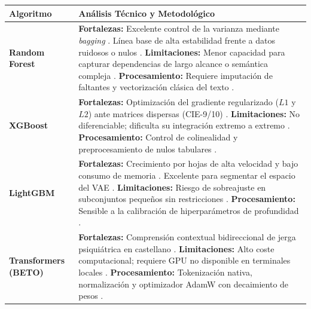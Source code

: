 \documentclass[12pt,a4paper,onecolumn,oneside]{report}
\begin{document}
\begin{table}[htbp]
\centering
\small
\renewcommand{\arraystretch}{1.3}
\begin{tabularx}{\textwidth}{|p{3cm}|X|}
\hline
\rowcolor[RGB]{239,239,239}
\textbf{Algoritmo} & \textbf{Análisis Técnico y Metodológico} \\ \hline
\textbf{Random Forest} & 
\textbf{Fortalezas:} Excelente control de la varianza mediante \textit{bagging} \cite{grinsztajn2022why}. Línea base de alta estabilidad frente a datos ruidosos o nulos \cite{lai2021schizophrenia}.\newline
\textbf{Limitaciones:} Menor capacidad para capturar dependencias de largo alcance o semántica compleja \cite{vidal2023algoritmo}.\newline
\textbf{Procesamiento:} Requiere imputación de faltantes y vectorización clásica del texto \cite{lai2021schizophrenia}. \\ \hline

\textbf{XGBoost} & 
\textbf{Fortalezas:} Optimización del gradiente regularizado ($L1$ y $L2$) ante matrices dispersas (CIE-9/10) \cite{grinsztajn2022why, saboori2025predictive}.\newline
\textbf{Limitaciones:} No diferenciable; dificulta su integración extremo a extremo \cite{grinsztajn2022why}.\newline
\textbf{Procesamiento:} Control de colinealidad y preprocesamiento de nulos tabulares \cite{lai2021schizophrenia}. \\ \hline

\textbf{LightGBM} & 
\textbf{Fortalezas:} Crecimiento por hojas de alta velocidad y bajo consumo de memoria \cite{grinsztajn2022why}. Excelente para segmentar el espacio del VAE \cite{saboori2025predictive}.\newline
\textbf{Limitaciones:} Riesgo de sobreajuste en subconjuntos pequeños sin restricciones \cite{grinsztajn2022why}.\newline
\textbf{Procesamiento:} Sensible a la calibración de hiperparámetros de profundidad \cite{saboori2025predictive}. \\ \hline

\textbf{Transformers (BETO)} & 
\textbf{Fortalezas:} Comprensión contextual bidireccional de jerga psiquiátrica en castellano \cite{canete2020beto, vidal2023algoritmo}.\newline
\textbf{Limitaciones:} Alto coste computacional; requiere GPU no disponible en terminales locales \cite{lopez2026ia}.\newline
\textbf{Procesamiento:} Tokenización nativa, normalización y optimizador AdamW con decaimiento de pesos \cite{canete2020beto}. \\ \hline


\end{tabularx}
\end{table}
\end{document}
